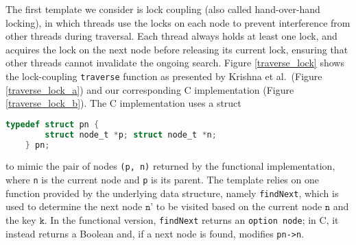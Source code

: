 \documentclass[sigplan,10pt, screen]{acmart}
\begin{document}
The first template we consider is lock coupling (also called hand-over-hand locking), in which threads use the locks on each node to prevent interference from other threads during traversal. Each thread always holds at least one lock, and acquires the lock on the next node before releasing its current lock, ensuring that other threads cannot invalidate the ongoing search.
Figure \ref{traverse_lock} shows the lock-coupling \lstinline{traverse} function as presented by Krishna et al.~(Figure \ref{traverse_lock_a}) and our corresponding C implementation (Figure \ref{traverse_lock_b}). The C implementation uses a struct
\begin{lstlisting}[language = C, backgroundcolor=\color{white}, basicstyle=\ttfamily\footnotesize, xleftmargin=-2.07em]
	typedef struct pn {
		struct node_t *p; struct node_t *n;
	} pn;
\end{lstlisting}
to mimic the pair of nodes \lstinline{(p, n)} returned by the functional implementation, where \lstinline{n} is the current node and \lstinline{p} is its parent. The template relies on one function provided by the underlying data structure, namely \lstinline{findNext}, which is used to determine the next node $\texttt{n'}$ to be visited based on the current node $\texttt{n}$ and the key $\texttt{k}$. In the functional version, \lstinline{findNext} returns an \lstinline{option node}; in C, it instead returns a Boolean and, if a next node is found, modifies \lstinline{pn->n}.

\end{document}
